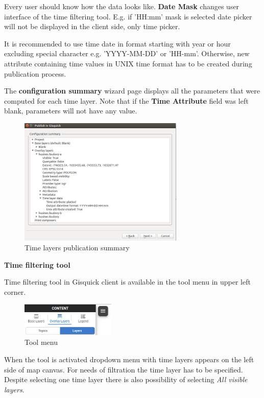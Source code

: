 Every user should know how the data looks like. 
\textbf{Date Mask} changes user interface of the time filtering tool. 
E.g. if 'HH:mm' mask is selected date picker will not be 
displayed in the client side, only time picker. 

It is recommended to use time date in format starting with 
year or hour excluding special character e.g. 'YYYY-MM-DD' or 'HH-mm'. 
Otherwise, new attribute containing time values in UNIX time format 
has to be created during publication process.

The \textbf{configuration summary} wizard page displays all the parameters 
that were computed for each time layer. Note that if the 
\textbf{Time Attribute} field was left blank, parameters will not have any 
value.

\begin{figure}[h!]
	\centering
	\includegraphics[width=0.7\textwidth]{../img/project-publishing-time-summary.png}
	\caption{Time layers publication summary}
	\label{fig:publication-wizard-summary}
\end{figure}

\bigskip
\noindent \textbf{Time filtering tool}

Time filtering tool in Gisquick client is available in the tool menu 
in upper left corner. 

\begin{figure}[h!]
	\centering
	\includegraphics[width=0.4\textwidth]{../img/burger-menu.png}
	\caption{Tool menu}
	\label{fig:burger-menu}
\end{figure}

\bigskip
When the tool is activated dropdown menu with time layers appears on 
the left side of map canvas. For needs of filtration the time layer 
has to be specified. Despite selecting one time layer there is
also possibility of selecting \textit{All visible layers}.

